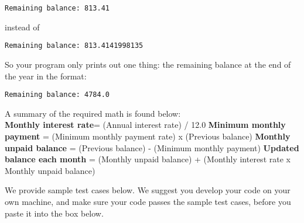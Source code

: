 \documentclass{article}
\begin{document}
  \verb|Remaining balance: 813.41|

  instead of

  \verb|Remaining balance: 813.4141998135|

  So your program only prints out one thing: the remaining balance at the end of
  the year in the format:

  \verb|Remaining balance: 4784.0|

  A summary of the required math is found below:\\
  \textbf{Monthly interest rate}= (Annual interest rate) / 12.0
  \textbf{Minimum monthly payment} = (Minimum monthly payment rate) x (Previous balance)
  \textbf{Monthly unpaid balance} = (Previous balance) - (Minimum monthly payment)
  \textbf{Updated balance each month} = (Monthly unpaid balance) + (Monthly interest rate
  x Monthly unpaid balance)

  We provide sample test cases below. We suggest you develop your code on your
  own machine, and make sure your code passes the sample test cases, before you
  paste it into the box below.

  \subsection*{}
\end{document}
